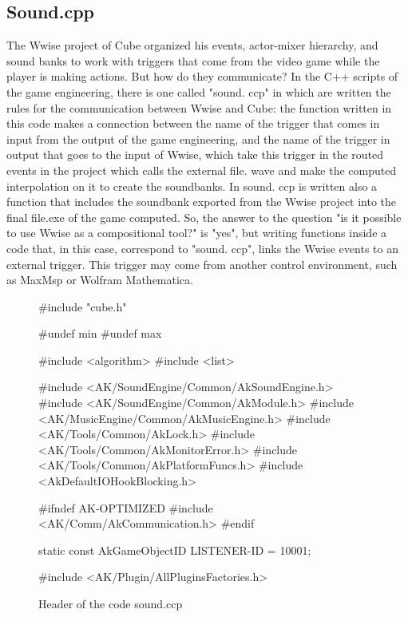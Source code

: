 		\subsection{Sound.cpp}
		The Wwise project of Cube organized his events, actor-mixer hierarchy, and sound banks to work with triggers that come from the video game while the player is making actions. But how do they communicate? In the C++ scripts of the game engineering, there is one called "sound. ccp" in which are written the rules for the communication between Wwise and Cube: the function written in this code makes a connection between the name of the trigger that comes in input from the output of the game engineering, and the name of the trigger in output that goes to the input of Wwise, which take this trigger in the routed events in the project which calls the external file. wave and make the computed interpolation on it to create the soundbanks. In sound. ccp is written also a function that includes the soundbank exported from the Wwise project into the final file.exe of the game computed.
		So, the answer to the question "is it possible to use Wwise as a compositional tool?" is "yes", but writing functions inside a code that, in this case, correspond to "sound. ccp", links the Wwise events to an external trigger. This trigger may come from another control environment, such as MaxMsp or Wolfram Mathematica.
		
\begin{figure}[h]
	\begin{code}
#include "cube.h"
					
#undef min
#undef max
					
#include <algorithm>
#include <list>
					
#include <AK/SoundEngine/Common/AkSoundEngine.h>
#include <AK/SoundEngine/Common/AkModule.h>
#include <AK/MusicEngine/Common/AkMusicEngine.h>
#include <AK/Tools/Common/AkLock.h>
#include <AK/Tools/Common/AkMonitorError.h>
#include <AK/Tools/Common/AkPlatformFuncs.h>
#include <AkDefaultIOHookBlocking.h>
			
#ifndef AK-OPTIMIZED
#include <AK/Comm/AkCommunication.h>
#endif
					
static const AkGameObjectID LISTENER-ID = 10001;
					
#include <AK/Plugin/AllPluginsFactories.h>
	\end{code}
	\caption{Header of the code sound.ccp}
\end{figure}
	

